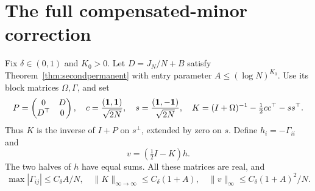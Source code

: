 \section{The full compensated-minor correction}
\label{sec:compensatedjet}
Fix \(\delta\in(0,1)\) and \(K_0>0\).
Let \(D=J_N/N+B\) satisfy Theorem~\ref{thm:secondpermanent}
with entry parameter \(A\leq(\log N)^{K_0}\).
Use its block matrices \(\Omega,\Gamma\), and set
\[
 P=\begin{pmatrix}0&D\\D^\top&0\end{pmatrix},\quad
 c=\frac{(\mathbf1,\mathbf1)}{\sqrt{2N}},\quad
 s=\frac{(\mathbf1,-\mathbf1)}{\sqrt{2N}},\quad
 K=(I+\Omega)^{-1}-\tfrac12cc^\top-ss^\top .
\]
Thus \(K\) is the inverse of \(I+P\) on \(s^\perp\),
extended by zero on \(s\).
Define \(h_i=-\Gamma_{ii}\) and
\[
 v=(\tfrac12I-K)h .
\]
The two halves of \(h\) have equal sums.
All these matrices are real, and
\[
 \max|\Gamma_{ij}|\leq C_\delta A/N,\quad
 \|K\|_{\infty\to\infty}\leq C_\delta(1+A),\quad
 \|v\|_\infty\leq C_\delta(1+A)^2/N .
\]

